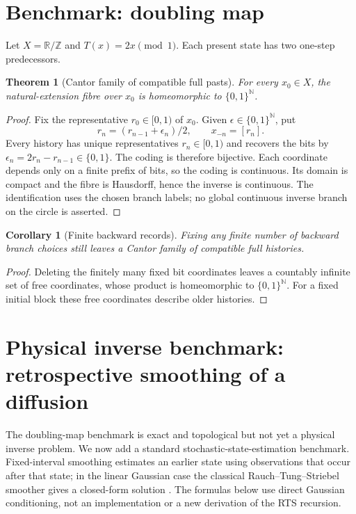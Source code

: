\documentclass[11pt]{article}
\newtheorem{theorem}[definition]{Theorem}
\newtheorem{corollary}[definition]{Corollary}
\begin{document}
\section{Benchmark: doubling map}
Let $X=\mathbb R/\mathbb Z$ and $T(x)=2x\pmod1$. Each present state has two one-step predecessors.
\begin{theorem}[Cantor family of compatible full pasts]
\label{thm:cantor-pasts}
For every $x_0\in X$, the natural-extension fibre over $x_0$ is homeomorphic to $\{0,1\}^{\mathbb N}$.
\end{theorem}
\begin{proof}
Fix the representative $r_0\in[0,1)$ of $x_0$. Given
$\epsilon\in\{0,1\}^{\mathbb N}$, put
\[
r_n=(r_{n-1}+\epsilon_n)/2,\qquad x_{-n}=[r_n].
\]
Every history has unique representatives $r_n\in[0,1)$ and recovers
the bits by $\epsilon_n=2r_n-r_{n-1}\in\{0,1\}$. The coding is
therefore bijective. Each coordinate depends only on a finite prefix
of bits, so the coding is continuous. Its domain is compact and the
fibre is Hausdorff, hence the inverse is continuous. The identification
uses the chosen branch labels; no global continuous inverse branch on
the circle is asserted.
\end{proof}
\begin{corollary}[Finite backward records]
\label{cor:finite-backward}
Fixing any finite number of backward branch choices still leaves
a Cantor family of compatible full histories.
\end{corollary}
\begin{proof}
Deleting the finitely many fixed bit coordinates leaves a countably
infinite set of free coordinates, whose product is homeomorphic to
$\{0,1\}^{\mathbb N}$. For a fixed initial block these free coordinates
describe older histories.
\end{proof}

\section{Physical inverse benchmark: retrospective smoothing of a diffusion}

The doubling-map benchmark is exact and topological but not yet a physical inverse problem.
We now add a standard stochastic-state-estimation benchmark. Fixed-interval smoothing
estimates an earlier state using observations that occur after that state; in the linear
Gaussian case the classical Rauch--Tung--Striebel smoother gives a closed-form solution
\cite[Section 3.2]{RauchTungStriebel1965}
\cite[Section 12.2, Theorem 12.2]{SarkkaSvensson2023}.
The formulas below use direct Gaussian conditioning, not an
implementation or a new derivation of the RTS recursion.
\end{document}
